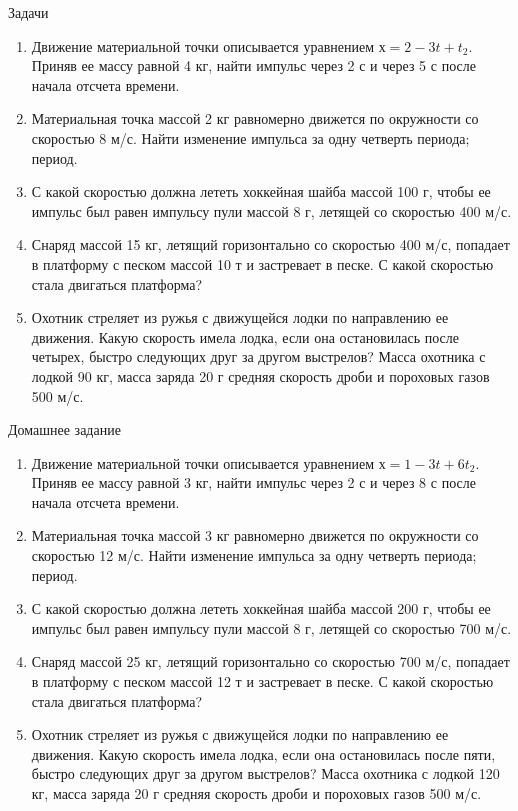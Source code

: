 \documentclass[a6paper, 11pt]{diss_4}
\renewcommand{\'}{\,'}
\begin{document}
\begin{center}
   Задачи
\end{center}
\begin{enumerate}
\item Движение материальной точки описывается уравнением $х = 2 - 3t + t_2$. Приняв ее массу равной 4 кг, найти импульс через 2 с и через 5 с после начала отсчета времени.
\item Материальная точка массой 2 кг равномерно движется по окружности со скоростью 8 м/с. Найти изменение импульса за одну четверть периода; период.
\item С какой скоростью должна лететь хоккейная шайба массой 100 г, чтобы ее импульс был равен импульсу пули массой 8 г, летящей со скоростью 400 м/с.
\item Снаряд массой 15 кг, летящий горизонтально со скоростью 400 м/с, попадает в платформу с песком массой 10 т и застревает в песке. С какой скоростью стала двигаться платформа?
\item Охотник стреляет из ружья с движущейся лодки по направлению ее движения. Какую скорость имела лодка, если она остановилась после четырех, быстро следующих друг за другом выстрелов? Масса охотника с лодкой 90 кг, масса заряда 20 г средняя скорость дроби и пороховых газов 500 м/с.
\end{enumerate}

\begin{center}
   Домашнее задание
\end{center}
\begin{enumerate}
\item Движение материальной точки описывается уравнением $х = 1 - 3t + 6t_2$. Приняв ее массу равной 3 кг, найти импульс через 2 с и через 8 с после начала отсчета времени.
\item Материальная точка массой 3 кг равномерно движется по окружности со скоростью 12 м/с. Найти изменение импульса за одну четверть периода; период.
\item С какой скоростью должна лететь хоккейная шайба массой 200 г, чтобы ее импульс был равен импульсу пули массой 8 г, летящей со скоростью 700 м/с.
\item Снаряд массой 25 кг, летящий горизонтально со скоростью 700 м/с, попадает в платформу с песком массой 12 т и застревает в песке. С какой скоростью стала двигаться платформа?
\item Охотник стреляет из ружья с движущейся лодки по направлению ее движения. Какую скорость имела лодка, если она остановилась после пяти, быстро следующих друг за другом выстрелов? Масса охотника с лодкой 120 кг, масса заряда 20 г средняя скорость дроби и пороховых газов 500 м/с.
\end{enumerate}
\end{document}
